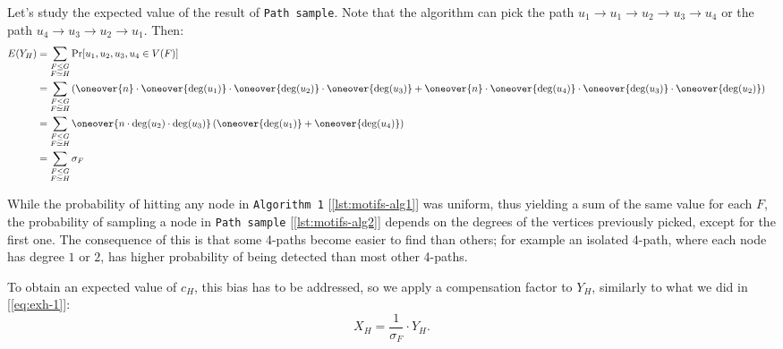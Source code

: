 Let's study the expected value of the result of \texttt{Path sample}. Note that the algorithm can pick the path $u_1 \to u_1 \to u_2 \to u_3 \to u_4$ or the path $u_4 \to u_3 \to u_2 \to u_1$. Then:
\begin{align*}
    E(Y_H) &= \sum_{\substack{F \leq G \\ F \simeq H}} \Pr[u_1, u_2, u_3, u_4 \in V(F)]                                                                 & \\
    &= \sum_{\substack{F \leq G \\ F \simeq H}} \left( \oneover{n} \cdot \oneover{\deg(u_1)} \cdot \oneover{\deg(u_2)} \cdot \oneover{\deg(u_3)} + \oneover{n} \cdot \oneover{\deg(u_4)} \cdot \oneover{\deg(u_3)} \cdot \oneover{\deg(u_2)} \right) & \\
    &= \sum_{\substack{F \leq G \\ F \simeq H}} \oneover{n \cdot \deg(u_2) \cdot \deg(u_3)} \left( \oneover{\deg(u_1)} + \oneover{\deg(u_4)} \right)    & \\
    &= \sum_{\substack{F \leq G \\ F \simeq H}} \sigma_F                                                                                                &
\end{align*}


While the probability of hitting any node in \texttt{Algorithm 1} [\ref{lst:motifs-alg1}] was uniform, thus yielding a sum of the same value for each $F$, the probability of sampling a node in \texttt{Path sample} [\ref{lst:motifs-alg2}] depends on the degrees of the vertices previously picked, except for the first one. The consequence of this is that some 4-paths become easier to find than others; for example an isolated 4-path, where each node has degree $1$ or $2$, has higher probability of being detected than most other 4-paths.

To obtain an expected value of $c_H$, this bias has to be addressed, so we apply a compensation factor to $Y_H$, similarly to what we did in [\ref{eq:exh-1}]:
\begin{equation}\label{eq:exh-2}
    X_H = \frac{1}{\sigma_F} \cdot Y_H.
\end{equation}

